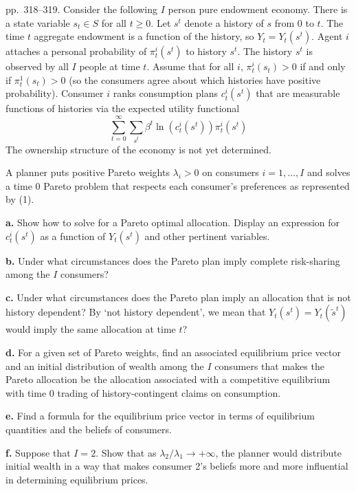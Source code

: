 \documentclass[12pt, letterpaper]{article}
\begin{document}
\begin{tcolorbox}[evenbox,title={Exercise 8.16 \quad Diverse beliefs, II}]
\begin{tcolorbox}[questionbox]
pp.~318--319. Consider the following $I$ person pure endowment economy. There is a state variable $s_t\in S$
for all $t\ge0$. Let $s^t$ denote a history of $s$ from 0 to $t$. The time $t$ aggregate endowment is a
function of the history, so $Y_t=Y_t(s^t)$. Agent $i$ attaches a personal probability of $\pi^i_t(s^t)$ to history
$s^t$. The history $s^t$ is observed by all $I$ people at time $t$. Assume that for all $i$, $\pi^i_t(s_t)>0$ if and
only if $\pi^1_t(s_t)>0$ (so the consumers agree about which histories have positive probability). Consumer
$i$ ranks consumption plans $c^i_t(s^t)$ that are measurable functions of histories via the expected utility
functional
\[
\sum_{t=0}^\infty\sum_{s^t}\beta^t\ln(c^i_t(s^t))\pi^i_t(s^t) \tag{1}
\]
The ownership structure of the economy is not yet determined.

A planner puts positive Pareto weights $\lambda_i>0$ on consumers $i=1,\dots,I$ and solves a time 0 Pareto
problem that respects each consumer's preferences as represented by (1).

\textbf{a.} Show how to solve for a Pareto optimal allocation. Display an expression for $c^i_t(s^t)$ as a
function of $Y_t(s^t)$ and other pertinent variables.

\textbf{b.} Under what circumstances does the Pareto plan imply complete risk-sharing among the $I$
consumers?

\textbf{c.} Under what circumstances does the Pareto plan imply an allocation that is not history
dependent? By `not history dependent', we mean that $Y_t(s^t)=Y_t(\tilde s^t)$ would imply the same
allocation at time $t$?

\textbf{d.} For a given set of Pareto weights, find an associated equilibrium price vector and an initial
distribution of wealth among the $I$ consumers that makes the Pareto allocation be the allocation
associated with a competitive equilibrium with time 0 trading of history-contingent claims on consumption.

\textbf{e.} Find a formula for the equilibrium price vector in terms of equilibrium quantities and the beliefs of
consumers.

\textbf{f.} Suppose that $I=2$. Show that as $\lambda_2/\lambda_1\to+\infty$, the planner would distribute initial
wealth in a way that makes consumer 2's beliefs more and more influential in determining equilibrium
prices.
\end{tcolorbox}


\end{tcolorbox}
\end{document}
